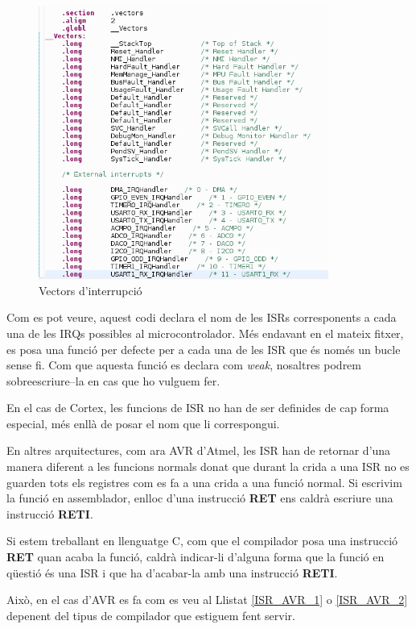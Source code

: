 \begin{figure}
 \centering
 \includegraphics[width=0.85\textwidth, keepaspectratio]{imatges/interruptvectorcortex.png}
 \caption{Vectors d'interrupció}
 \label{fig:ISR}
\end{figure}

Com es pot veure, aquest codi declara el nom de les ISRs corresponents a cada una de les IRQs possibles al microcontrolador. Més endavant en el mateix fitxer, es posa una funció per defecte per a cada una de les ISR que és només un bucle sense fi. Com que aquesta funció es declara com {\em weak}, nosaltres podrem sobreescriure–la en cas que ho vulguem fer.

En el cas de Cortex, les funcions de ISR no han de ser definides de cap forma especial, més enllà de posar el nom que li correspongui.

En altres arquitectures, com ara AVR d'Atmel, les ISR han de retornar d'una manera diferent a les funcions normals donat que durant la crida a una ISR no es guarden tots els registres com es fa a una crida a una funció normal. Si escrivim la funció en assemblador, enlloc d'una instrucció {\bf RET} ens caldrà escriure una instrucció {\bf RETI}.

Si estem treballant en llenguatge C, com que el compilador posa una instrucció {\bf RET} quan acaba la funció, caldrà indicar-li d'alguna forma que la funció en qüestió és una ISR i que ha d'acabar-la amb una instrucció {\bf RETI}.

Això, en el cas d'AVR es fa com es veu al Llistat \ref{ISR_AVR_1} o \ref{ISR_AVR_2} depenent del tipus de compilador que estiguem fent servir.

